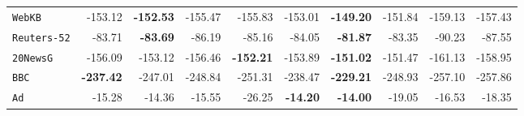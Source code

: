 \documentclass[xcolor={usenames,dvipsnames,svgnames}, compress]{beamer}
\begin{document}
\begin{frame}[t]
\begin{table}[t]
\begin{tabular}{l r r r r  r | r r r r}
    \texttt{WebKB}      & -153.12                              & \textbf{-152.53}                               & -155.47                & -155.83 & -153.01 & \textbf{-149.20} & -151.84        & -159.13         & -157.43         \\ 
    \texttt{Reuters-52} & -83.71                               & \textbf{-83.69}                                & -86.19                 & -85.16  & -84.05  & \textbf{-81.87}  & -83.35         & -90.23          & -87.55          \\ 
    \texttt{20NewsG}    & -156.09                              & -153.12                               & -156.46                & \textbf{-152.21} & -153.89 & \textbf{-151.02} & -151.47        & -161.13         & -158.95         \\ 
    \texttt{BBC}        & \textbf{-237.42}                              & -247.01                               & -248.84                & -251.31 & -238.47 & \textbf{-229.21} & -248.93        & -257.10         & -257.86         \\ 
    \texttt{Ad}         & -15.28                               & -14.36                                & -15.55                 & -26.25  & \textbf{-14.20}  & \textbf{-14.00}  & -19.05         & -16.53          & -18.35          \\ 
    \bottomrule
  \end{tabular}
  \label{tab:ll-ens}
\end{table}
\hspace{50pt}%
\end{frame}
\end{document}
